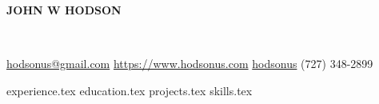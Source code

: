 \documentclass[11pt]{article}
\newcommand*{\sectiondir}{sections/}
\newcommand*{\headerspace}{\vspace{.05cm}}
\begin{document}
	\rfoot{\today}

	\noindent\centerline{ \huge\textbf{JOHN W HODSON} }\\
	\headerspace

	\noindent
	\faEnvelopeSquare \space \href{mailto:hodsonus@gmail.com}{hodsonus@gmail.com} \hspace*{\fill}
	\faHome \space \href{https://www.hodsonus.com}{https://www.hodsonus.com} \hspace*{\fill}
	\faGithub \space \href{https://github.com/hodsonus}{hodsonus} \hspace*{\fill}
	\faMobilePhone \space (727) 348-2899\\
	\headerspace

	{experience.tex}
	{education.tex}
	{projects.tex}
	{skills.tex}
\end{document}
